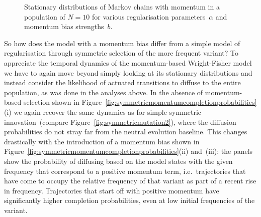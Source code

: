 \begin{knitrout}
\color{fgcolor}\begin{figure}[htbp]

{\centering {}

}

\caption[Stationary distributions of Markov chains with momentum.]{Stationary distributions of Markov chains with momentum in a population of $N=10$ for various regularisation parameters~$\alpha$ and momentum bias strengths~$b$.}\label{fig:momentumstationary}
\end{figure}


\end{knitrout}

So how does the model with a momentum bias differ from a simple model of regularisation through symmetric selection of the more frequent variant? To appreciate the temporal dynamics of the momentum-based Wright-Fisher model we have to again move beyond simply looking at its stationary distributions and instead consider the likelihood of actuated transitions to diffuse to the entire population, as was done in the analyses above. 
In the absence of momentum-based selection shown in Figure~\ref{fig:symmetricmomentumcompletionprobabilities}(i) we again recover the same dynamics as for simple symmetric innovation~(compare Figure~\ref{fig:symmetricmutation2}), where the diffusion probabilities do not stray far from the neutral evolution baseline.
This changes drastically with the introduction of a momentum bias shown in Figure~\ref{fig:symmetricmomentumcompletionprobabilities}(ii) and~(iii): the panels show the probability of diffusing based on the model states with the given frequency that correspond to a positive momentum term, i.e.~trajectories that have come to occupy the relative frequency of that variant as part of a recent rise in frequency. Trajectories that start off with positive momentum have significantly higher completion probabilities, even at low initial frequencies of the variant.

